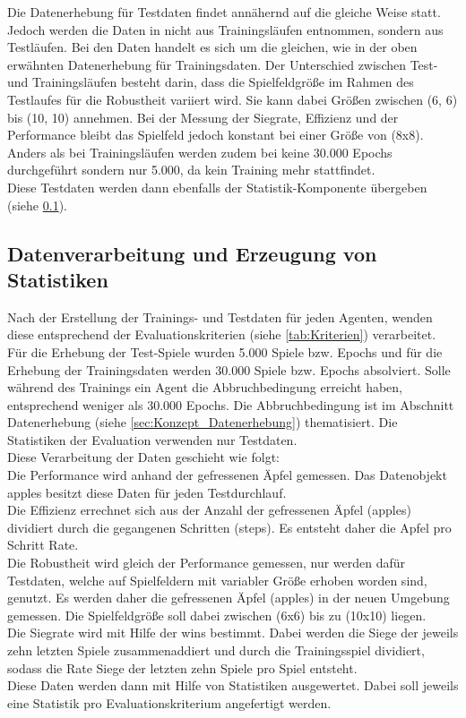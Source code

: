 Die Datenerhebung für Testdaten findet annähernd auf die gleiche Weise statt. Jedoch werden die Daten in nicht aus Trainingsläufen entnommen, sondern aus Testläufen. Bei den Daten handelt es sich um die gleichen, wie in der oben erwähnten Datenerhebung für Trainingsdaten. Der Unterschied zwischen Test- und Trainingsläufen besteht darin, dass die Spielfeldgröße im Rahmen des Testlaufes für die Robustheit variiert wird. Sie kann dabei Größen zwischen (6, 6) bis (10, 10) annehmen. Bei der Messung der Siegrate, Effizienz und der Performance bleibt das Spielfeld jedoch konstant bei einer Größe von (8x8). Anders als bei Trainingsläufen werden zudem bei keine 30.000 Epochs durchgeführt sondern nur 5.000, da kein Training mehr stattfindet.\\
Diese Testdaten werden dann ebenfalls der Statistik-Komponente übergeben (siehe \ref{sec:Konzept_Datenverarbeitung}).

\subsection{Datenverarbeitung und Erzeugung von Statistiken} \label{sec:Konzept_Datenverarbeitung}
Nach der Erstellung der Trainings- und Testdaten für jeden Agenten, wenden diese entsprechend der Evaluationskriterien (siehe \ref{tab:Kriterien}) verarbeitet. Für die Erhebung der Test-Spiele wurden 5.000 Spiele bzw. Epochs und für die Erhebung der Trainingsdaten werden 30.000 Spiele bzw. Epochs absolviert. Solle während des Trainings ein Agent die Abbruchbedingung erreicht haben, entsprechend weniger als 30.000 Epochs. Die Abbruchbedingung ist im Abschnitt Datenerhebung (siehe \ref{sec:Konzept_Datenerhebung}) thematisiert. Die Statistiken der Evaluation verwenden nur Testdaten.\\
Diese Verarbeitung der Daten geschieht wie folgt:\\
Die Performance wird anhand der gefressenen Äpfel gemessen. Das Datenobjekt apples besitzt diese Daten für jeden Testdurchlauf.\\
Die Effizienz errechnet sich aus der Anzahl der gefressenen Äpfel (apples) dividiert durch die gegangenen Schritten (steps). Es entsteht daher die Apfel pro Schritt Rate.\\
Die Robustheit wird gleich der Performance gemessen, nur werden dafür Testdaten, welche auf Spielfeldern mit variabler Größe erhoben worden sind, genutzt. 
Es werden daher die gefressenen Äpfel (apples) in der neuen Umgebung gemessen. Die Spielfeldgröße soll dabei zwischen (6x6) bis zu (10x10) liegen.\\
Die Siegrate wird mit Hilfe der wins bestimmt. Dabei werden die Siege der jeweils zehn letzten Spiele zusammenaddiert und durch die Trainingsspiel dividiert, sodass die Rate Siege der letzten zehn Spiele pro Spiel entsteht.\\
Diese Daten werden dann mit Hilfe von Statistiken ausgewertet. Dabei soll jeweils eine Statistik pro Evaluationskriterium angefertigt werden. 
